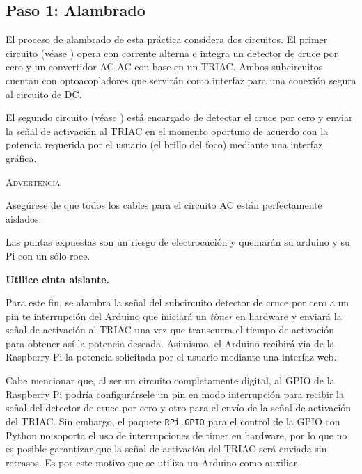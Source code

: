 %
%


\subsection{Paso 1: Alambrado}%
\label{sec:step1}

El proceso de alambrado de esta práctica considera dos circuitos.
El primer circuito (véase ) opera con corrente alterna e integra un detector de cruce por cero y un convertidor AC-AC con base en un TRIAC.
Ambos subcircuitos cuentan con optoacopladores que servirán como interfaz para una conexión segura al circuito de DC.

El segundo circuito (véase ) está encargado de detectar el cruce por cero y enviar la señal de activación al TRIAC en el momento oportuno de acuerdo con la potencia requerida por el usuario (el brillo del foco) mediante una interfaz gráfica.

\medskip
\begin{importantbox}{\large \textsc{Advertencia}}
	\begin{center}
		Asegúrese de que todos los cables para el circuito AC están perfectamente aislados.

		Las puntas expuestas son un riesgo de electrocución y quemarán su arduino y su Pi con un sólo roce.

		\medskip{}

		\textbf{Utilice cinta aislante.}
	\end{center}
\end{importantbox}

Para este fin, se alambra la señal del subcircuito detector de cruce por cero a un pin te interrupción del Arduino que iniciará un \emph{timer} en hardware y enviará la señal de activación al TRIAC una vez que transcurra el tiempo de activación para obtener así la potencia deseada.
Asimismo, el Arduino recibirá via \IIC de la Raspberry Pi la potencia solicitada por el usuario mediante una interfaz web.

Cabe mencionar que, al ser un circuito completamente digital, al GPIO de la Raspberry Pi podría configurársele un pin en modo interrupción para recibir la señal del detector de cruce por cero y otro para el envío de la señal de activación del TRIAC.
Sin embargo, el paquete \texttt{RPi.GPIO} para el control de la GPIO con Python no soporta el uso de interrupciones de timer en hardware, por lo que no es posible garantizar que la señal de activación del TRIAC será enviada sin retrasos.
Es por este motivo que se utiliza un Arduino como auxiliar.

